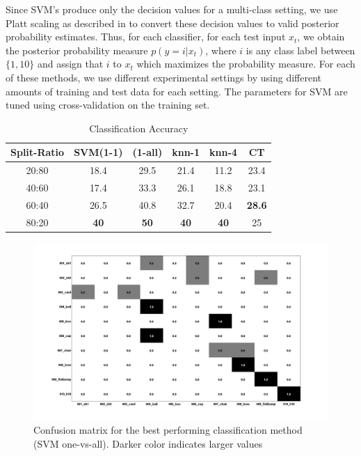 \documentclass[10pt,twocolumn,letterpaper]{article}
\begin{document}
Since SVM's produce only the decision values for a multi-class setting, we use Platt scaling as described in \cite{Platt1999} to convert these decision values to valid posterior probability estimates. Thus, for each classifier, for each test input $x_t$, we obtain the posterior probability measure $p(y=i|x_t)$, where $i$ is any class label between $\{1,10\}$ and assign that $i$  to $x_t$ which maximizes the probability measure. 
For each of these methods, we use different experimental settings by using different amounts of training and test data for each setting. The parameters for SVM are tuned using cross-validation  on the training set. 

\begin{table}[ht] 
\caption{Classification Accuracy} %
\centering %
\begin{tabular}{c c c c c c} %
\hline\hline %
Split-Ratio  & SVM(1-1) & (1-all) & knn-1 & knn-4 & CT\\ [0.5ex] %
\hline %
20:80 &	18.4	 & 29.5  & 21.4 & 11.2 & 23.4 \\
40:60 &	17.4 &	33.3 & 26.1	& 18.8 &	 23.1 \\
60:40 &	26.5	 & 40.8	 & 32.7	& 20.4 &	 \textbf{28.6} \\
80:20 &	\textbf{40}   &	\textbf{50}	 & \textbf{40}	& \textbf{40}	   & 25 \\  [1ex]
\hline %
\end{tabular} 
\label{table:acc} %
\end{table} 

\begin{figure}[ht]
\includegraphics[scale=0.16]{conf_svm_ovr.png}
\caption{Confusion matrix for the best performing classification method (SVM one-vs-all). Darker color indicates larger values}
\label{Fig:conf_mat}
\end{figure}
\end{document}
